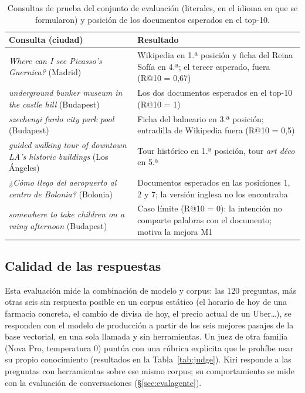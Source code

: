 \begin{table}[h]
\centering\scriptsize
\caption{Consultas de prueba del conjunto de evaluación (literales, en el idioma en que se formularon) y posición de los documentos esperados en el top-10.}\label{tab:queries}
\begin{tabularx}{\columnwidth}{@{}YL{2.75cm}@{}}
\toprule
\textbf{Consulta (ciudad)} & \textbf{Resultado} \\
\midrule
\emph{Where can I see Picasso's Guernica?} (Madrid) & Wikipedia en 1.ª posición y ficha del Reina Sofía en 4.ª; el tercer esperado, fuera (R@10 = 0,67) \\
\emph{underground bunker museum in the castle hill} (Budapest) & Los dos documentos esperados en el top-10 (R@10 = 1) \\
\emph{szechenyi furdo city park pool} (Budapest) & Ficha del balneario en 3.ª posición; entradilla de Wikipedia fuera (R@10 = 0,5) \\
\emph{guided walking tour of downtown LA's historic buildings} (Los Ángeles) & Tour histórico en 1.ª posición, tour \emph{art déco} en 5.ª \\
\emph{¿Cómo llego del aeropuerto al centro de Bolonia?} (Bolonia) & Documentos esperados en las posiciones 1, 2 y 7; la versión inglesa no los encontraba \\
\emph{somewhere to take children on a rainy afternoon} (Budapest) & Caso límite (R@10 = 0): la intención no comparte palabras con el documento; motiva la mejora M1 \\
\bottomrule
\end{tabularx}
\end{table}

\subsection{Calidad de las respuestas}\label{sec:evalresp}

Esta evaluación mide la combinación de modelo y corpus: las 120 preguntas, más otras seis sin
respuesta posible en un corpus estático (el horario de hoy de una farmacia concreta, el cambio de
divisa de hoy, el precio actual de un Uber\ldots), se responden con el modelo de producción a
partir de los seis mejores pasajes de la base vectorial, en una sola llamada y sin herramientas. Un
juez de otra familia (Nova Pro, temperatura 0) puntúa con una rúbrica explícita que le prohíbe usar
su propio conocimiento (resultados en la Tabla~\ref{tab:judge}). Kiri responde a las preguntas con herramientas sobre ese mismo corpus; su
comportamiento se mide con la evaluación de conversaciones (§\ref{sec:evalagente}).

